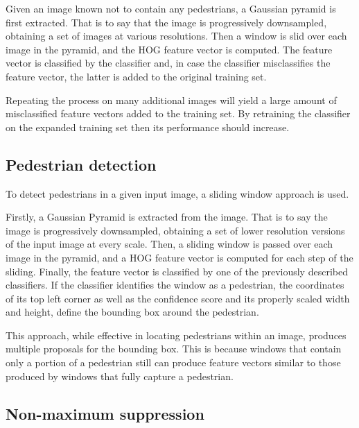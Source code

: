 \documentclass[journal,twocolumn]{IEEEtran}
\begin{document}
Given an image known not to contain any pedestrians, a Gaussian pyramid is first extracted. That is to say that the image is progressively downsampled, obtaining a set of images at various resolutions. Then a window is slid over each image in the pyramid, and the HOG feature vector is computed. The feature vector is classified by the classifier and, in case the classifier misclassifies the feature vector, the latter is added to the original training set. 

Repeating the process on many additional images will yield a large amount of misclassified feature vectors added to the training set. By retraining the classifier on the expanded training set then its performance should increase.

\subsection{Pedestrian detection}

To detect pedestrians in a given input image, a sliding window approach is used. 

Firstly, a Gaussian Pyramid is extracted
from the image. That is to say the image is progressively
downsampled, obtaining a set of lower resolution versions of the input image at every scale. Then, a sliding window is passed over each image in the
pyramid, and a HOG feature vector is computed for each step
of the sliding. Finally, the feature vector is classified by one of the
previously described classifiers. If the classifier identifies the
window as a pedestrian, the coordinates of its top left corner
as well as the confidence score and its properly scaled width
and height, define the bounding box around the pedestrian.

This approach, while effective in locating pedestrians within
an image, produces multiple proposals for the bounding box.
This is because windows that contain only a portion of a
pedestrian still can produce feature vectors similar to those produced by windows that fully capture a pedestrian.

\subsection{Non-maximum suppression}
\end{document}
